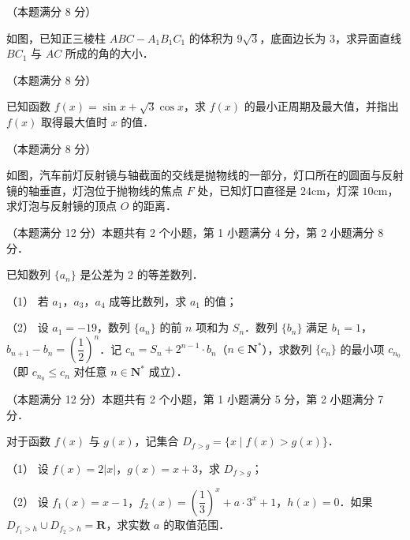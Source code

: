 \Needspace{0.4\textheight}
\begin{question}
（本题满分 8 分）

如图，已知正三棱柱 \(ABC-A_{1}B_{1}C_{1}\) 的体积为 \(9\sqrt{3}\)，底面边长为 3，求异面直线 \(BC_{1}\) 与 \(AC\) 所成的角的大小．
\nopagebreak[4]
\begin{center}\end{center}
\nopagebreak[4]
\end{question}
\begin{question}
（本题满分 8 分）

已知函数 \(f(x)=\sin x+\sqrt{3}\cos x\)，求 \(f(x)\) 的最小正周期及最大值，并指出 \(f(x)\) 取得最大值时 \(x\) 的值．

\Needspace{0.4\textheight}
\end{question}
\begin{question}
（本题满分 8 分）

如图，汽车前灯反射镜与轴截面的交线是抛物线的一部分，灯口所在的圆面与反射镜的轴垂直，灯泡位于抛物线的焦点 \(F\) 处，已知灯口直径是 \(24\mathrm{cm}\)，灯深 \(10\mathrm{cm}\)，求灯泡与反射镜的顶点 \(O\) 的距离．
\nopagebreak[4]
\begin{center}\end{center}
\nopagebreak[4]
\end{question}
\begin{question}
（本题满分 12 分）本题共有 2 个小题，第 1 小题满分 4 分，第 2 小题满分 8 分．

已知数列 \(\{a_{n}\}\) 是公差为 2 的等差数列．

（1） 若 \(a_{1}\)，\(a_{3}\)，\(a_{4}\) 成等比数列，求 \(a_{1}\) 的值；

（2） 设 \(a_{1}=-19\)，数列 \(\{a_{n}\}\) 的前 \(n\) 项和为 \(S_{n}\)．数列 \(\{b_{n}\}\) 满足 \(b_{1}=1\)，\(b_{n+1}-b_{n}=\left(\dfrac{1}{2}\right)^{n}\)．记 \(c_{n}=S_{n}+2^{n-1}\cdot b_{n}\)（\(n\in\mathbf{N}^{*}\)），求数列 \(\{c_{n}\}\) 的最小项 \(c_{n_{0}}\)（即 \(c_{n_{0}}\leqslant c_{n}\) 对任意 \(n\in\mathbf{N}^{*}\) 成立）．

\end{question}
\begin{question}
（本题满分 12 分）本题共有 2 个小题，第 1 小题满分 5 分，第 2 小题满分 7 分．

对于函数 \(f(x)\) 与 \(g(x)\)，记集合 \(D_{f>g}=\{x\mid f(x)>g(x)\}\)．

（1） 设 \(f(x)=2|x|\)，\(g(x)=x+3\)，求 \(D_{f>g}\)；

（2） 设 \(f_{1}(x)=x-1\)，\(f_{2}(x)=\left(\dfrac{1}{3}\right)^{x}+a\cdot 3^{x}+1\)，\(h(x)=0\)．如果 \(D_{f_{1}>h}\cup D_{f_{2}>h}=\mathbf{R}\)，求实数 \(a\) 的取值范围．

\end{question}

